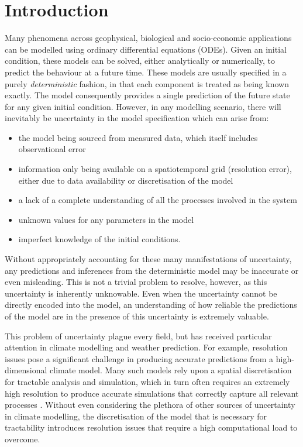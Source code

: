 
\chapter{Introduction}\label{ch:intro}
Many phenomena across geophysical, biological and socio-economic applications can be modelled using ordinary differential equations (ODEs).
Given an initial condition, these models can be solved, either analytically or numerically, to predict the behaviour at a future time.
These models are usually specified in a purely \emph{deterministic} fashion, in that each component is treated as being known exactly.
The model consequently provides a single prediction of the future state for any given initial condition.
However, in any modelling scenario, there will inevitably be uncertainty in the model specification which can arise from:
\begin{itemize}
	\item the model being sourced from measured data, which itself includes observational error
	\item information only being available on a spatiotemporal grid (resolution error), either due to data availability or discretisation of the model
	\item a lack of a complete understanding of all the processes involved in the system
	\item unknown values for any parameters in the model
	\item imperfect knowledge of the initial conditions.
\end{itemize}
Without appropriately accounting for these many manifestations of uncertainty, any predictions and inferences from the deterministic model may be inaccurate or even misleading.
This is not a trivial problem to resolve, however, as this uncertainty is inherently unknowable.
Even when the uncertainty cannot be directly encoded into the model, an understanding of how reliable the predictions of the model are in the presence of this uncertainty is extremely valuable.

This problem of uncertainty plague every field, but has received particular attention in climate modelling and weather prediction.
For example, resolution issues pose a significant challenge in producing accurate predictions from a high-dimensional climate model.
Many such models rely upon a spatial discretisation for tractable analysis and simulation, which in turn often requires an extremely high resolution to produce accurate simulations that correctly capture all relevant processes \citep{DawsonEtAl_2012_SimulatingRegimeStructures}.
Without even considering the plethora of other sources of uncertainty in climate modelling, the discretisation of the model that is necessary for tractability introduces resolution issues that require a high computational load to overcome.

